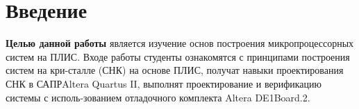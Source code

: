 \chapter*{Введение}

\textbf{Целью данной работы} является изучение основ построения микропроцессорных систем на ПЛИС. Входе работы студенты ознакомятся с принципами построения систем на кри-сталле (СНК) на основе ПЛИС, получат навыки проектирования СНК в САПРAltera Quartus II, выполнят проектирование и верификацию системы с исполь-зованием отладочного комплекта Altera DE1Board.2.

